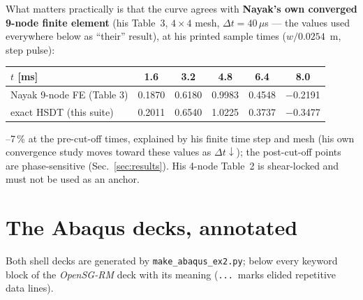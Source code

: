 \documentclass[11pt]{article}
\newcommand{\code}[1]{\texttt{#1}}
\begin{document}
What matters practically is that the curve agrees with \textbf{Nayak's own
converged 9-node finite element} (his Table~3, $4\times4$ mesh,
$\Delta t=40\,\mu$s --- the values used everywhere below as ``their''
result), at his printed sample times ($w/0.0254$~m, step pulse):

\begin{center}\begin{tabular}{lccccc}\toprule
$t$ [ms] & 1.6 & 3.2 & 4.8 & 6.4 & 8.0\\\midrule
Nayak 9-node FE (Table 3) & 0.1870 & 0.6180 & 0.9983 & 0.4548 & $-$0.2191\\
exact HSDT (this suite)   & 0.2011 & 0.6540 & 1.0225 & 0.3737 & $-$0.3477\\
\bottomrule\end{tabular}\end{center}

--7\,\% at the pre-cut-off times, explained by his finite time
step and mesh (his own convergence study moves toward these values as
$\Delta t\!\downarrow$); the post-cut-off points are phase-sensitive
(Sec.~\ref{sec:results}).  His 4-node Table~2 is shear-locked and must
not be used as an anchor.

\section{The Abaqus decks, annotated}
\label{sec:decks}
Both shell decks are generated by \code{make\_abaqus\_ex2.py}; below every
keyword block of the \emph{OpenSG-RM} deck with its meaning
(\code{...}~marks elided repetitive data lines).
\end{document}
